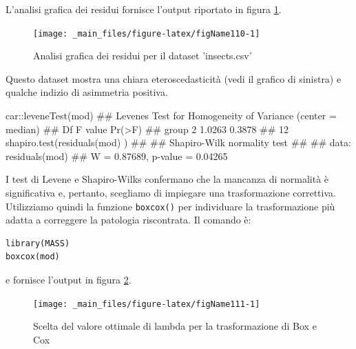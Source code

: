 \documentclass[a4paper,12pt,oneside]{book}
\newenvironment{Shaded}{\begin{snugshade}}{\end{snugshade}}
\newcommand{\SpecialCharTok}[1]{#1}
\newcommand{\DocumentationTok}[1]{#1}
\newcommand{\FunctionTok}[1]{#1}
\newcommand{\NormalTok}[1]{#1}
\begin{document}
L'analisi grafica dei residui fornisce l'output riportato in figura \ref{fig:figName110}.

\begin{figure}

{\centering \texttt{[image: \_main\_files/figure-latex/figName110-1]} 

}

\caption{Analisi grafica dei residui per il dataset 'insects.csv'}\label{fig:figName110}
\end{figure}

Questo dataset mostra una chiara eteroscedasticità (vedi il grafico di sinistra) e qualche indizio di asimmetria positiva.

\begin{Shaded}
\begin{Highlighting}[]
\NormalTok{car}\SpecialCharTok{::}\FunctionTok{leveneTest}\NormalTok{(mod)}
\DocumentationTok{\#\# Levene\textquotesingle{}s Test for Homogeneity of Variance (center = median)}
\DocumentationTok{\#\#       Df F value Pr(\textgreater{}F)}
\DocumentationTok{\#\# group  2  1.0263 0.3878}
\DocumentationTok{\#\#       12}
\FunctionTok{shapiro.test}\NormalTok{(}\FunctionTok{residuals}\NormalTok{(mod) )}
\DocumentationTok{\#\# }
\DocumentationTok{\#\#  Shapiro{-}Wilk normality test}
\DocumentationTok{\#\# }
\DocumentationTok{\#\# data:  residuals(mod)}
\DocumentationTok{\#\# W = 0.87689, p{-}value = 0.04265}
\end{Highlighting}
\end{Shaded}

I test di Levene e Shapiro-Wilks confermano che la mancanza di normalità è significativa e, pertanto, scegliamo di impiegare una trasformazione correttiva. Utilizziamo quindi la funzione \texttt{boxcox()} per individuare la trasformazione più adatta a correggere la patologia riscontrata. Il comando è:

\begin{verbatim}
library(MASS)
boxcox(mod)
\end{verbatim}

e fornisce l'output in figura \ref{fig:figName111}.

\begin{figure}

{\centering \texttt{[image: \_main\_files/figure-latex/figName111-1]} 

}

\caption{Scelta del valore ottimale di lambda per la trasformazione di Box e Cox}\label{fig:figName111}
\end{figure}
\end{document}
